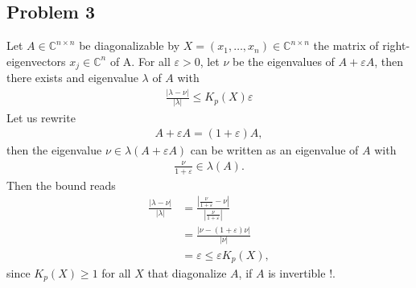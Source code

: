 \subsection{Problem 3}
Let $A \in \mathbb{C}^{n\times n}$ be diagonalizable by $X = (x_1,\ldots,x_n)
\in \mathbb{C}^{n \times n}$ the matrix of right-eigenvectors $x_j \in
\mathbb{C}^{n}$ of A. For all $\varepsilon> 0 $, let $\nu$ be the eigenvalues
of $A+\varepsilon A$, then there exists and eigenvalue $\lambda$ of $A$ with
\begin{align}
    \frac{|\lambda - \nu|}{|\lambda|} \le K_p(X)\varepsilon
\end{align}
Let us rewrite
\begin{align}
    A + \varepsilon A = (1+\varepsilon) A,
\end{align}
then the eigenvalue $\nu \in \lambda(A+\varepsilon A)$ can be written as an
eigenvalue of $A$ with
\begin{align}
    \frac{\nu}{1+\varepsilon} \in \lambda (A).
\end{align}
Then the bound reads
\begin{align}
    \frac{|\lambda - \nu|}{|\lambda|}
    &= \frac{|\frac{\nu}{1+\varepsilon} - \nu|}{|\frac{\nu}{1+\varepsilon}|}\\
    &= \frac{|\nu - (1+\varepsilon)\nu|}{|\nu|}\\
    &= \varepsilon \le \varepsilon K_p(X),
\end{align}
since $K_p(X) \ge 1$ for all $X$ that diagonalize $A$, if $A$ is invertible
!.
